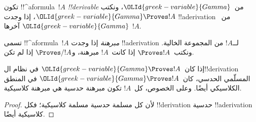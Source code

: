 \documentclass[../../../include/open-logic-section]{subfiles}
\begin{document}
\begin{defn}[!!^{derivability}]
تكون !!^a{formula}~$!A$ \emph{!!{derivable}} من~$\OLId{greek-variable}{Gamma}$، ونكتب
$\OLId{greek-variable}{Gamma} \Proves !A$، إذا وجدت !!a{derivation} من~$\OLId{greek-variable}{Gamma}$ آخرها
$!A$.
\end{defn}

\begin{defn}[المبرهنات]
تسمى !!^a{formula}~$!A$ \emph{مبرهنة} إذا وجدت !!a{derivation}
لــ$!A$ من المجموعة الخالية. ونكتب~$\Proves !A$ إذا كانت~$!A$
مبرهنة، و$\Proves/ !A$ إذا لم تكن.
\end{defn}

\begin{prop}
  إذا كان~$\OLId{greek-variable}{Gamma} \Proves !A$ في نظام ال!!{derivation} المسلّمي
  الحدسي، كان~$\OLId{greek-variable}{Gamma} \Proves !A$ في المنطق الكلاسيكي أيضًا. وعلى
  الخصوص، كل~$!A$ تكون مبرهنة حدسية هي مبرهنة كلاسيكية.
\end{prop}

\begin{proof}
  لأن كل مسلمة حدسية مسلمة كلاسيكية؛ فكل !!{derivation} حدسية
  !!a{derivation} كلاسيكية أيضًا.
\end{proof}
\end{document}
